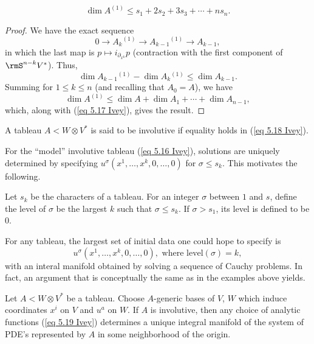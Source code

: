 \begin{prop}
    \[\dim A^{(1)}\leq s_1+2s_2+3s_3+\cdots +ns_n. \label{eq 5.18 Ivey}\]
\end{prop}
\begin{proof}
    We have the exact sequence 
    \[0\to A_k{}^{(1)}\to A_{k-1}{}^{(1)}\to A_{k-1},\]
    in which the last map is $p\mapsto i_{\partial_{x^k}}p$ (contraction with the first component of $\rmS^{n-k}V^\ast$). Thus, 
    \[\dim A_{k-1}{}^{(1)}-\dim A_k{}^{(1)}\leq \dim A_{k-1}.\]   
    Summing for $1\leq k\leq n$ (and recalling that $A_0=A$), we have 
    \[\dim A^{(1)}\leq \dim A+\dim A_1+\cdots +\dim A_{n-1},\]
    which, along with (\ref{eq 5.17 Ivey}), gives the result.
\end{proof}
\begin{defn}
    A tableau $A<W\otimes V^\ast$ is said to be involutive if equality holds in (\ref{eq 5.18 Ivey}).
\end{defn}


For the ``model'' involutive tableau (\ref{eq 5.16 Ivey}), solutions are uniquely determined by specifying $u^\sigma(x^1,\ldots,x^k,0,\ldots,0)$ for $\sigma\leq s_k$. This motivates the following.

\begin{defn}[Level]
    Let $s_k$ be the characters of a tableau. For an integer $\sigma$ between $1$ and $s$, define the level of $\sigma$ be the largest $k$ such that $\sigma\leq s_k$. If $\sigma>s_1$, its level is defined to be $0$.
\end{defn}

For any tableau, the largest set of initial data one could hope to specify is 
\[u^\sigma(x^1,\ldots,x^k,0,\ldots,0),\text{ where }\mathrm{level}(\sigma)=k,\label{eq 5.19 Ivey}\]
with an interal manifold obtained by solving a sequence of Cauchy problems. In fact, an argument that is conceptually the same as in the examples above yields.

\begin{thm}\label{thm 5.5.7 Ivey}
    Let $A<W\otimes V^\ast$ be a tableau. Choose $A$-generic bases of $V$, $W$ which induce coordinates $x^i$ on $V$ and $u^a$ on $W$. If $A$ is involutive, then any choice of analytic functions (\ref{eq 5.19 Ivey}) determines a unique integral manifold of the system of PDE's represented by $A$ in some neighborhood of the origin.
\end{thm}

